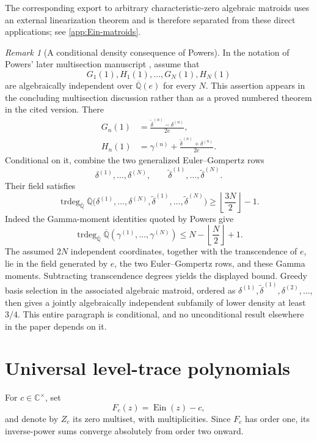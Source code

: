 \documentclass[11pt]{article}
\theoremstyle{definition}
\theoremstyle{remark}
\newtheorem{remark}[theorem]{Remark}
\newcommand{\Qbar}{\overline{\mathbb Q}}
\newcommand{\C}{\mathbb C}
\newcommand{\Ein}{\operatorname{Ein}}
\newcommand{\trdeg}{\operatorname{trdeg}}
\begin{document}
The corresponding export to arbitrary characteristic-zero algebraic
matroids uses an external linearization theorem and is therefore separated
from these direct applications; see \cref{app:Ein-matroids}.

\begin{remark}[A conditional density consequence of Powers]
\label{rem:Powers-conditional}
In the notation of Powers' later multisection manuscript
\cite[\S5]{Powers2025}, assume that
\[
 G_1(1),H_1(1),\ldots,G_N(1),H_N(1)
\]
are algebraically independent over \(\Qbar(e)\) for every \(N\).  This
assertion appears in the concluding multisection discussion rather than as
a proved numbered theorem in the cited version.  There
\begin{align*}
 G_n(1)&=\frac{\widetilde\delta^{(n)}-\delta^{(n)}}{2e},\\
 H_n(1)&=\gamma^{(n)}+
 \frac{\widetilde\delta^{(n)}+\delta^{(n)}}{2e}.
\end{align*}
Conditional on it, combine the two generalized Euler--Gompertz rows
\[
 \delta^{(1)},\ldots,\delta^{(N)},\qquad
 \widetilde\delta^{(1)},\ldots,\widetilde\delta^{(N)}.
\]
Their field satisfies
\[
 \trdeg_{\Qbar}\Qbar\bigl(
 \delta^{(1)},\ldots,\delta^{(N)},
 \widetilde\delta^{(1)},\ldots,\widetilde\delta^{(N)}\bigr)
 \ge\left\lfloor\frac{3N}{2}\right\rfloor-1.
\]
Indeed the Gamma-moment identities quoted by Powers give
\[
 \trdeg_{\Qbar}\Qbar(\gamma^{(1)},\ldots,\gamma^{(N)})
 \le N-\left\lfloor\frac N2\right\rfloor+1.
\]
The assumed \(2N\) independent coordinates, together with the
transcendence of \(e\), lie in the field generated by \(e\), the two
Euler--Gompertz rows, and these Gamma moments.  Subtracting transcendence
degrees yields the displayed bound.  Greedy basis selection in the
associated algebraic matroid, ordered as
\(\delta^{(1)},\widetilde\delta^{(1)},\delta^{(2)},\ldots\), then gives a
jointly algebraically independent subfamily of lower density at least
\(3/4\).  This entire paragraph is conditional, and no unconditional
result elsewhere in the paper depends on it.
\end{remark}

\section{Universal level-trace polynomials}
\label{sec:trace-polynomials}

For \(c\in\C^\times\), set
\[
 F_c(z)=\Ein(z)-c,
\]
and denote by \(Z_c\) its zero multiset, with multiplicities.  Since \(F_c\)
has order one, its inverse-power sums converge absolutely from order two
onward.
\end{document}

